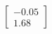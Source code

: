 \documentclass[preview]{standalone}
\begin{document}
\begin{align*}
\begin{bmatrix} -0.05 \\ 1.68 \end{bmatrix}
\end{align*}
\end{document}
